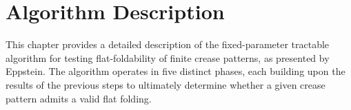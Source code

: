 



\chapter{Algorithm Description}

This chapter provides a detailed description of the fixed-parameter tractable algorithm for testing flat-foldability of finite crease patterns, as presented by Eppstein. The algorithm operates in five distinct phases, each building upon the results of the previous steps to ultimately determine whether a given crease pattern admits a valid flat folding.

